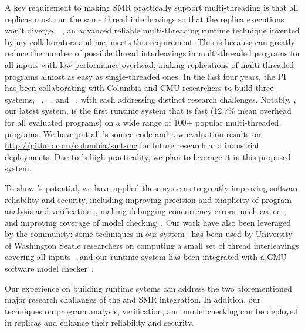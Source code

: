 A key requirement to making SMR practically support multi-threading is that all 
replicas must run the same thread interleavings so that the replica executions 
won't diverge. \smt~\cite{smt:cacm}, an advanced reliable multi-threading 
runtime technique invented by my collaborators and me, meets this requirement. 
This is because \smt can greatly reduce the number of possible thread 
interleavings in multi-threaded programs for all inputs with low performance 
overhead, making replications of multi-threaded programs almost as easy as 
single-threaded ones. In the last four years, the PI has been collaborating 
with Columbia and CMU researchers to build three \smt systems, 
\tern~\cite{cui:tern:osdi10}, \peregrine~\cite{peregrine:sosp11}, and 
\parrot~\cite{parrot:sosp13}, with each addressing distinct research 
challenges. Notably, \parrot, our latest system, is the first \smt runtime 
system that is fast (12.7\% mean overhead for all evaluated programs) on a wide 
range of 100+ popular multi-threaded programs. We have 
put all \parrot's source code and raw evaluation results on 
\url{http://github.com/columbia/smt-mc} for future research and industrial 
deployments. Due to \parrot's high practicality, we plan to leverage it in this 
proposed \msmr system.

To show \smt's potential, we have applied these systems to greatly improving 
software reliability and security, including improving precision and simplicity 
of program analysis and verification~\cite{wu:pldi12}, making debugging 
concurrency errors much easier~\cite{cui:tern:osdi10}, and improving coverage 
of model checking~\cite{parrot:sosp13}. Our work have also been leveraged by 
the community: some techniques in our \tern system~\cite{cui:tern:osdi10} has 
been used by University of Washington Seatle researchers on computing a small 
set of thread interleavings covering all inputs~\cite{ics:oopsla13}, and our 
\parrot runtime system has been integrated with a CMU software model 
checker~\cite{dbug:spin11}.

Our experience on building \smt runtime sytems can address the two 
aforementioned major research challanges of the \smt and SMR integration. In 
addition, our techniques on program analysis, verification, and model checking 
can be deployed in \msmr replicas and enhance their reliability and security.


